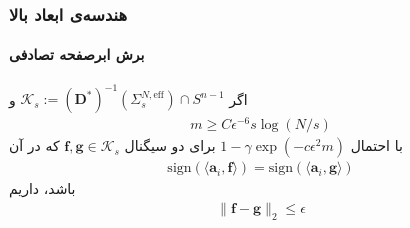 \begin{frame}
\frametitle{هندسه‌ی ابعاد بالا}
\framesubtitle{برش ابرصفحه تصادفی}
\begin{small}
\begin{theorem}
اگر
$ \mathcal{K}_{s}:= \left(\mathbf{D}^{\ast}\right)^{-1}\left(\Sigma_{s}^{N,\text{eff}}\right)\cap S^{n-1} $
و
\begin{align*}
	m \geq C \epsilon^{-6} s \log\left(N/s\right)
\end{align*}
با احتمال
$1-\gamma\exp(-c\epsilon^{2}m)$
برای دو سیگنال 
$\bm{f},\bm{g}\in \mathcal{K}_{s}$
که در آن
\begin{align}
\text{sign}(\langle \bm{a}_i,\bm{f}\rangle)=\text{sign}(\langle \bm{a}_i,\bm{g}\rangle)
\end{align}
باشد، داریم
\begin{align}
\|\bm{f}-\bm{g}\|_{2}\leq \epsilon
\end{align}
\end{theorem}
\end{small}
\cite{Baraniuk2017}
\end{frame}
